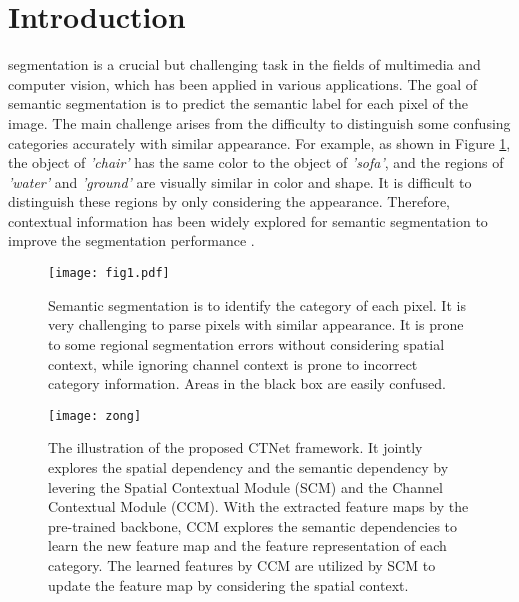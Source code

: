 \documentclass[10pt,journal,cspaper,compsoc]{IEEEtran}
\begin{document}
	
	
\section{Introduction}
 segmentation is a crucial but challenging task in the fields of multimedia and computer vision, which has been applied in various applications. The goal of semantic segmentation is to predict the semantic label for each pixel of the image. The main challenge arises from the difficulty to distinguish some confusing categories accurately with similar appearance. For example, as shown in Figure \ref{fig1}, the object of \textit{'chair'} has the same color to the object of \textit{'sofa'}, and the regions of \textit{'water'} and \textit{'ground'} are visually similar in color and shape. It is difficult to distinguish these regions by only considering the appearance. Therefore, contextual information has been widely explored for semantic segmentation to improve the segmentation performance \cite{hung2017scene, chen2017rethinking, ding2018context, zhao2017pyramid}.
	
\begin{figure}
	\centering
	\texttt{[image: fig1.pdf]}
	\caption{Semantic segmentation is to identify the category of each pixel. It is very challenging to parse pixels with similar appearance. It is prone to some regional segmentation errors without considering spatial context, while ignoring channel context is prone to incorrect category information. Areas in the black box are easily confused.}
	\label{fig1}
	\vspace{-4mm}
\end{figure}
	
\begin{figure*}
	\centering
	\texttt{[image: zong]}
	\caption{The illustration of the proposed CTNet framework. It jointly explores the spatial dependency and the semantic dependency by levering the Spatial Contextual Module (SCM) and the Channel Contextual Module (CCM). With the extracted feature maps by the pre-trained backbone, CCM explores the semantic dependencies to learn the new feature map and the feature representation of each category. The learned features by CCM are utilized by SCM to update the feature map by considering the spatial context.}
	\label{fig2}
	\vspace{-4mm}
\end{figure*}
	
\end{document}
